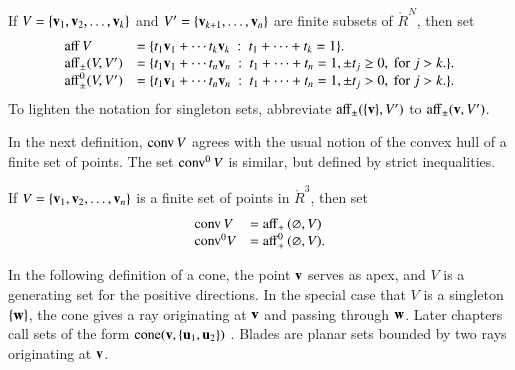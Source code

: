 \begin{definition}[affine]\label{def:aff} 
 If $V = \{{\mathbf v}_1,{\mathbf v}_2,\ldots,{\mathbf v}_k\}$ 
and $V'=\{{\mathbf v}_{k+1},\ldots,{\mathbf v}_n\}$ are  finite subsets of $\ring{R}^N$, then
set
	\begin{displaymath}\begin{array}{lll}
      {\operatorname{aff}}\, V &= \{t_1 {\mathbf v}_1 +\cdots t_k {\mathbf v}_k \ :\ 
	t_1 +\cdots+t_k = 1\}.\\
        {\operatorname{aff}}_{\pm} (V,V') &= \{t_1 {\mathbf v}_1 +\cdots t_n {\mathbf v}_n \ :\ 
	t_1 +\cdots+t_n = 1, \pm t_j \ge 0, \text{ for } j>k.\}.\\
        {\operatorname{aff}}^0_{\pm} (V,V') &= \{t_1 {\mathbf v}_1 +\cdots t_n {\mathbf v}_n \ :\ 
	t_1 +\cdots+t_n = 1, \pm t_j > 0, \text{ for } j>k.\}.\\
		\end{array}
        \end{displaymath}
To lighten the notation for singleton sets, abbreviate ${\operatorname{aff}}_\pm(\{{\mathbf v}\},V')$ to
${\operatorname{aff}}_\pm({\mathbf v},V')$.
%
%
%
%
%
\end{definition}


In the next definition, ${\operatorname{conv}}\,V$ agrees with the usual
notion of the convex hull of a finite set of points.
The set ${\operatorname{conv}}^0\,V$ is similar, but defined by strict inequalities.


\begin{definition}  If $V = \{{\mathbf v}_1,{\mathbf v}_2,\ldots,{\mathbf v}_n\}$ is a finite set
of points in $\ring{R}^3$, then
set
	\begin{displaymath}
        \begin{array}{lll}
          {\operatorname{conv}}\, V &= {\operatorname{aff}}_+\, (\varnothing,V)\\
	   {\operatorname{conv}}^0 V &= {\operatorname{aff}}^0_+\, (\varnothing,V).\\
           \end{array}
        \end{displaymath}
%
%
%
\end{definition}

In the following definition of a cone, the point ${\mathbf v}$ serves
as apex, and $V$ is a generating set for the positive directions.
In the special case that $V$ is a singleton $\{{\mathbf w}\}$, 
the cone gives
a ray originating at ${\mathbf v}$ and passing through ${\mathbf w}$.  Later
chapters call sets of the form ${\operatorname{cone}}({\mathbf v},\{{\mathbf u}_1,{\mathbf u}_2\})$ .
Blades are planar sets bounded by two rays originating at ${\mathbf v}$.
%
%
%

